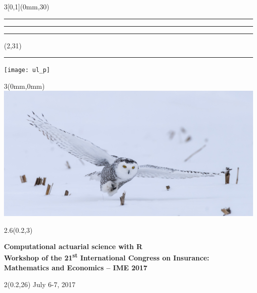 \begingroup

\textblockorigin{0mm}{0mm}
\setlength{\parindent}{0mm}
\setlength{\banderougewidth}{2\TPHorizModule}
\setlength{\banderougeheight}{\TPVertModule}
\setlength{\bandeorwidth}{\TPHorizModule}
\setlength{\bandeorheight}{\banderougeheight}
\setlength{\imageheight}{29\TPVertModule}
\setlength{\imagewidth}{3\TPHorizModule}
\setlength{\logoheight}{2.5\TPVertModule}
\setlength{\gapwidth}{0.75pt}
\addtolength{\bandeorwidth}{-\gapwidth}
\addtolength{\imageheight}{-\gapwidth}

\begin{frame}[plain]
  \begin{textblock*}{3\TPHorizModule}[0,1](0mm,30\TPVertModule)
    \textcolor{rouge}{\rule{\banderougewidth}{\banderougeheight}}%
    \rule{\gapwidth}{0pt}%
    \textcolor{or}{\rule{\bandeorwidth}{\bandeorheight}}           %
  \end{textblock*}

  \begin{textblock*}{\TPHorizModule}(2\TPHorizModule,31\TPVertModule)
    \rule{\gapwidth}{0pt}%
    \texttt{[image: ul\_p]}
  \end{textblock*}

  \begin{textblock*}{3\TPHorizModule}(0mm,0mm)
    \includegraphics[height=\imageheight,width=\imagewidth]{Fotolia_99831160.jpg}
  \end{textblock*}

  \begin{textblock*}{2.6\TPHorizModule}(0.2\TPHorizModule,3\TPVertModule)
    \raggedright%
    \bfseries
    \fontsize{22}{22}\selectfont
    Computational actuarial science with R \\
    \mdseries
    \fontsize{12}{13}\selectfont
    Workshop of the 21\textsuperscript{st} International Congress on
    Insurance: \\ Mathematics and Economics -- IME 2017
  \end{textblock*}

  \begin{textblock*}{2\TPHorizModule}(0.2\TPHorizModule,26\TPVertModule)
    \fontsize{10}{12}\selectfont
    July 6-7, 2017
  \end{textblock*}
\end{frame}
\endgroup

